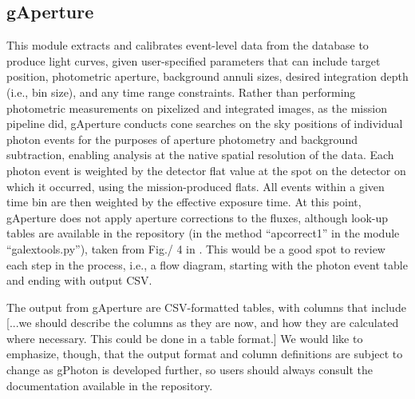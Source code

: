 \documentclass[5p]{elsarticle}
\begin{document}
\subsection{gAperture}
This module extracts and calibrates event-level data from the database to produce light curves, given user-specified parameters that can include target position, photometric aperture, background annuli sizes, desired integration depth (i.e., bin size), and any time range constraints. Rather than performing photometric measurements on pixelized and integrated images, as the mission pipeline did, gAperture conducts cone searches on the sky positions of individual photon events for the purposes of aperture photometry and background subtraction, enabling analysis at the native spatial resolution of the data. Each photon event is weighted by the detector flat value at the spot on the detector on which it occurred, using the mission-produced flats. All events within a given time bin are then weighted by the effective exposure time.  At this point, gAperture does not apply aperture corrections to the fluxes, although look-up tables are available in the repository (in the method ``apcorrect1'' in the module ``galextools.py''), taken from Fig./ 4 in \citet{mor2007}.  {\color{red}This would be a good spot to review each step in the process, i.e., a flow diagram, starting with the photon event table and ending with output CSV.}

The output from gAperture are CSV-formatted tables, with columns that include {\color{red}[...we should describe the columns as they are now, and how they are calculated where necessary.  This could be done in a table format.]}  We would like to emphasize, though, that the output format and column definitions are subject to change as gPhoton is developed further, so users should always consult the documentation available in the repository.
\end{document}
